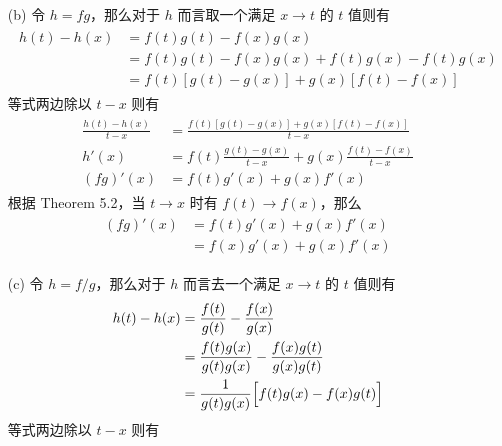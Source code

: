 \documentclass[../poma-notes.tex]{subfiles}
\begin{document}
\begin{anote}
  \begin{enumerate}
    \item [(b)] 令 $h = fg$，那么对于 $h$ 而言取一个满足 $x \to t$ 的 $t$ 值则有
          \begin{align*}
            \begin{split}
              h(t) - h(x) &= f(t)g(t) - f(x)g(x) \\
              &= f(t)g(t) - f(x)g(x) + f(t)g(x) - f(t)g(x) \\
              &= f(t)[g(t) - g(x)] + g(x)[f(t) - f(x)]
            \end{split}
          \end{align*}
          等式两边除以 $t - x$ 则有
          \begin{align*}
            \begin{split}
              \frac{h(t) - h(x)}{t - x} &= \frac{f(t)[g(t) - g(x)] + g(x)[f(t) - f(x)]}{t - x} \\
              h'(x) &= f(t) \frac{g(t) - g(x)}{t - x} + g(x) \frac{f(t) - f(x)}{t - x} \\
              (fg)'(x) &= f(t) g'(x) + g(x) f'(x)
            \end{split}
          \end{align*}
          根据 Theorem 5.2，当 $t \to x$ 时有 $f(t) \to f(x)$，那么
          \begin{align*}
            \begin{split}
              (fg)'(x) &= f(t) g'(x) + g(x) f'(x) \\
              &= f(x)g'(x) + g(x)f'(x)
            \end{split}
          \end{align*}
    \item [(c)] 令 $h = f/g$，那么对于 $h$ 而言去一个满足 $x \to t$ 的 $t$ 值则有
          \begin{align*}
            \begin{split}
              h(t) - h(x) &= \frac{f(t)}{g(t)} - \frac{f(x)}{g(x)} \\
              &= \frac{f(t)g(x)}{g(t)g(x)} - \frac{f(x)g(t)}{g(x)g(t)} \\
              &= \frac{1}{g(t)g(x)}\Bigl[ f(t)g(x) - f(x)g(t) \Bigr]
            \end{split}
          \end{align*}
          等式两边除以 $t - x$ 则有
          \begin{align*}
            \begin{split}

\end{split}
\end{align*}
\end{enumerate}
\end{anote}
\end{document}
